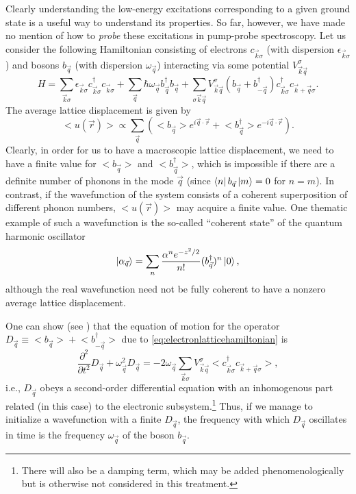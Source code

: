 Clearly understanding the low-energy excitations corresponding to a given ground state is a useful way to understand its properties.
So far, however, we have made no mention of how to \emph{probe} these excitations in pump-probe spectroscopy.
Let us consider the following Hamiltonian consisting of electrons $c_{\vec{k}\sigma}$ (with dispersion $\epsilon_{\vec{k}\sigma}$) and bosons $b_{\vec{q}}$ (with dispersion $\omega_{\vec{q}}$) interacting via some potential $V^\sigma_{\vec{k}\vec{q}}$
\begin{equation}\label{eq:electronlatticehamiltonian}
H = \sum_{\vec{k}\sigma}\epsilon_{\vec{k}\sigma}c^\dagger_{\vec{k}\sigma}c_{\vec{k}\sigma}
+\sum_{\vec{q}}\hbar \omega_{\vec{q}}b^\dagger_{\vec{q}}b_{\vec{q}}
+\sum_{\sigma\vec{k}\vec{q}}V^\sigma_{\vec{k}\vec{q}}\left(b_{\vec{q}}+b^\dagger_{-\vec{q}}\right)c^\dagger_{\vec{k}\sigma}c_{\vec{k}+\vec{q}\sigma}.
\end{equation}
The average lattice displacement is given by
\begin{equation}
\big<u(\vec{r})\big> \propto \sum_{\vec{q}}\left(\big<b_{\vec{q}}\big>e^{i\vec{q}\cdot\vec{r}}+\big<b^\dagger_{\vec{q}}\big>e^{-i\vec{q}\cdot\vec{r}}\right).
\end{equation}
Clearly, in order for us to have a macroscopic lattice displacement, we need to have a finite value for $\big<b_{\vec{q}}\big>$ and $\big<b^\dagger_{\vec{q}}\big>$, which is impossible if there are a definite number of phonons in the mode $\vec{q}$ (since $\bra{n}b_{\vec{q}}\ket{m}=0$ for $n=m$).
In contrast, if the wavefunction of the system consists of a coherent superposition of different phonon numbers, $\big<u(\vec{r})\big>$ may acquire a finite value.
One thematic example of such a wavefunction is the so-called ``coherent state'' of the quantum harmonic oscillator
\begin{equation}\label{eq:coherentstate}
\ket{\alpha_{\vec{q}}} = \sum_n \frac{\alpha^ne^{-z^2/2}}{n!}(b^\dagger_{\vec{q}})^n\ket{0},
\end{equation}
although the real wavefunction need not be fully coherent to have a nonzero average lattice displacement.

One can show (see \citet{kuznetsov_theory_1994}) that the equation of motion for the operator $D_{\vec{q}}\equiv \big<b_{\vec{q}}\big>+\big<b^\dagger_{-\vec{q}}\big>$ due to \cref{eq:electronlatticehamiltonian} is
\begin{equation}\label{eq:coherentoscillationwaveequation}
\frac{\partial^2}{\partial t^2}D_{\vec{q}}+\omega^2_{\vec{q}}D_{\vec{q}} = -2\omega_{\vec{q}}\sum_{\vec{k}\sigma}V^\sigma_{\vec{k}\vec{q}}\big<c^\dagger_{\vec{k}\sigma} c_{\vec{k}+\vec{q}\sigma}\big>,
\end{equation}
i.e., $D_{\vec{q}}$ obeys a second-order differential equation with an inhomogenous part related (in this case) to the electronic subsystem.\footnote{There will also be a damping term, which may be added phenomenologically but is otherwise not considered in this treatment.}
Thus, if we manage to initialize a wavefunction with a finite $D_{\vec{q}}$, the frequency with which $D_{\vec{q}}$ oscillates in time is the frequency $\omega_{\vec{q}}$ of the boson $b_{\vec{q}}$.

